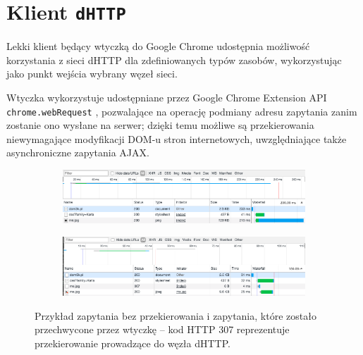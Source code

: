 \section{Klient \texttt{dHTTP}}
Lekki klient będący wtyczką do Google Chrome udostępnia możliwość korzystania z sieci dHTTP dla zdefiniowanych typów zasobów, wykorzystując jako punkt wejścia wybrany węzeł sieci.

Wtyczka wykorzystuje udostępniane przez Google Chrome Extension API \texttt{chrome.webRequest} \cite{webRequestAPI}, pozwalające na operację podmiany adresu zapytania zanim zostanie ono wysłane na serwer; dzięki temu możliwe są przekierowania  niewymagające modyfikacji DOM-u stron internetowych, uwzględniające także asynchroniczne zapytania AJAX.

\begin{figure}[h]
	\centering
	\begin{subfigure}{1\textwidth}
		\centering
		\includegraphics[scale=0.45]{no-redir.png}
		\subcaption{\label{subfigure_a}}
    \end{subfigure}
    \begin{subfigure}{1\textwidth}
		\centering
		\includegraphics[scale=0.45]{redir.png}
		\subcaption{\label{subfigure_b}}
	\end{subfigure}
	
	\caption{Przykład zapytania bez przekierowania \protect{} i zapytania, które zostało przechwycone przez wtyczkę \protect{} -- kod HTTP 307 reprezentuje przekierowanie prowadzące do węzła dHTTP.}

\end{figure}

